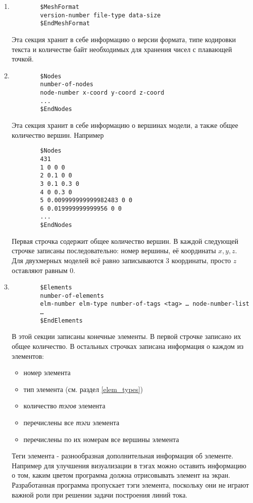 \begin{enumerate}
	\item 
	\begin{verbatim}
		$MeshFormat
		version-number file-type data-size
		$EndMeshFormat
	\end{verbatim}
	Эта секция хранит в себе информацию о версии формата, типе кодировки текста и количестве байт необходимых для хранения чисел с плавающей точкой.
	
	\item
	\begin{verbatim}
		$Nodes
		number-of-nodes
		node-number x-coord y-coord z-coord
		...
		$EndNodes
	\end{verbatim}
	Эта секция хранит в себе информацию о вершинах модели, а также общее количество вершин. Например
	\begin{verbatim}
		$Nodes
		431
		1 0 0 0
		2 0.1 0 0
		3 0.1 0.3 0
		4 0 0.3 0
		5 0.009999999999982483 0 0
		6 0.019999999999956 0 0
		...
		$EndNodes
	\end{verbatim}
	Первая строчка содержит общее количество вершин. В каждой следующей строчке записаны последовательно: номер вершины, её координаты $x,y,z$. Для двухмерных моделей всё равно записываются 3 координаты, просто $z$ оставляют равным 0.
	
	\item
	\begin{verbatim}
		$Elements
		number-of-elements
		elm-number elm-type number-of-tags <tag> … node-number-list
		…
		$EndElements
	\end{verbatim}
	В этой секции записаны конечные элементы. В первой строчке записано их общее количество. В остальных строчках записана информация о каждом из элементов:
	\begin{itemize}
		\item номер элемента
		\item тип элемента (см. раздел \ref{elem_types})
		\item количество \textit{тэгов} элемента
		\item перечислены все \textit{тэги} элемента
		\item перечислены по их номерам все вершины элемента
	\end{itemize}
	Теги элемента - разнообразная дополнительная информация об элементе. Например для улучшения визуализации в тэгах можно оставить информацию о том, каким цветом программа должна отрисовывать элемент на экран. Разработанная программа пропускает тэги элемента, поскольку они не играют важной роли при решении задачи построения линий тока.
	

\end{enumerate}
